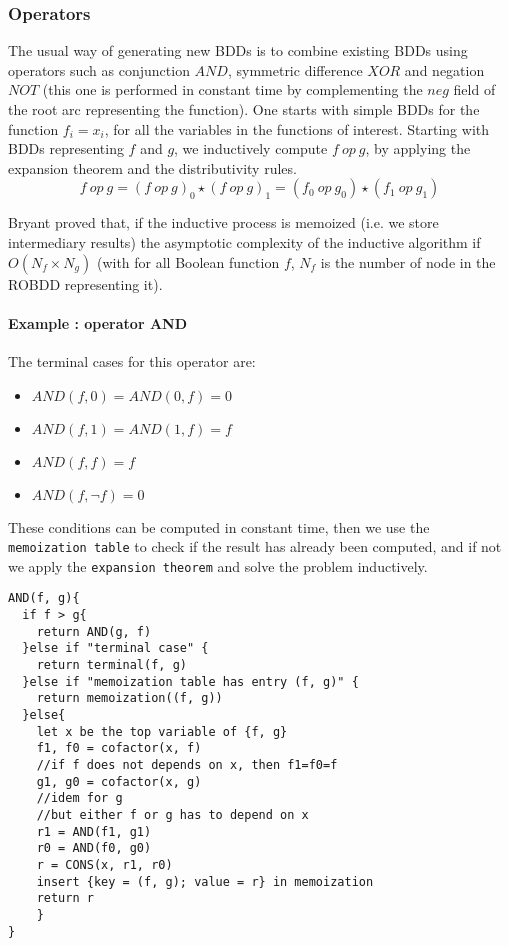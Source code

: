 \documentclass[a4paper,10pt]{article}
\begin{document}
\subsubsection{Operators}

\newcommand{\op}{~op~}

The usual way of generating new BDDs is to combine existing BDDs using operators such as conjunction $AND$, symmetric difference $XOR$ and negation $NOT$ (this one is performed in constant time by complementing the $neg$ field of the root arc representing the function).
One starts with simple BDDs for the function $f_i = x_i$, for all the variables in the functions of interest.
Starting with BDDs representing $f$ and $g$, we inductively compute $f\op g$, by applying the expansion theorem and the distributivity rules.
\[f\op g = (f\op g)_0 \star (f\op g)_1 = (f_0\op g_0)\star(f_1 \op g_1)\]

Bryant \cite{Bryant1986} proved that, if the inductive process is memoized (i.e. we store intermediary results) the asymptotic complexity of the inductive algorithm if $O(N_f \times N_g)$ (with for all Boolean function $f$, $N_f$ is the number of node in the ROBDD representing it).

\paragraph{Example : operator AND\\}
The terminal cases for this operator are:\begin{itemize}
\item $AND(f, 0) = AND(0, f) = 0$
\item $AND(f, 1) = AND(1, f) = f$
\item $AND(f, f) = f$
\item $AND(f, \lnot f) = 0$
\end{itemize}

These conditions can be computed in constant time, then we use the \texttt{memoization table} to check if the result has already been computed, and if not we apply the \texttt{expansion theorem} and solve the problem inductively.

\begin{lstlisting}
AND(f, g){
  if f > g{
    return AND(g, f)
  }else if "terminal case" {
    return terminal(f, g)
  }else if "memoization table has entry (f, g)" {
    return memoization((f, g))
  }else{
    let x be the top variable of {f, g}
    f1, f0 = cofactor(x, f)
    //if f does not depends on x, then f1=f0=f
    g1, g0 = cofactor(x, g)
    //idem for g
    //but either f or g has to depend on x
    r1 = AND(f1, g1)
    r0 = AND(f0, g0)
    r = CONS(x, r1, r0)
    insert {key = (f, g); value = r} in memoization
    return r
    }
}
\end{lstlisting}
\end{document}
